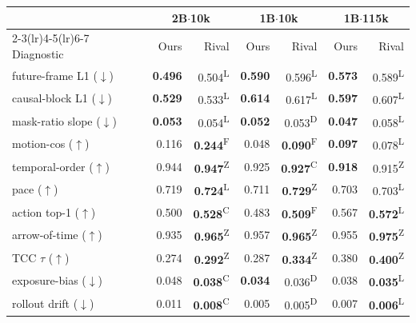 \documentclass[letterpaper]{article} %
\begin{document}
\begin{table}[t]
\centering
\small
\setlength{\tabcolsep}{2pt}
\begin{tabular}{lrrrrrr}
\toprule
 & \multicolumn{2}{c}{2B$\cdot$10k} & \multicolumn{2}{c}{1B$\cdot$10k} & \multicolumn{2}{c}{1B$\cdot$115k} \\
\cmidrule(lr){2-3}\cmidrule(lr){4-5}\cmidrule(lr){6-7}
Diagnostic & Ours & Rival & Ours & Rival & Ours & Rival \\
\midrule
future-frame L1 ($\downarrow$) & \textbf{0.496} & 0.504\textsuperscript{L} & \textbf{0.590} & 0.596\textsuperscript{L} & \textbf{0.573} & 0.589\textsuperscript{L} \\
causal-block L1 ($\downarrow$) & \textbf{0.529} & 0.533\textsuperscript{L} & \textbf{0.614} & 0.617\textsuperscript{L} & \textbf{0.597} & 0.607\textsuperscript{L} \\
mask-ratio slope ($\downarrow$) & \textbf{0.053} & 0.054\textsuperscript{L} & \textbf{0.052} & 0.053\textsuperscript{D} & \textbf{0.047} & 0.058\textsuperscript{L} \\
motion-cos ($\uparrow$) & 0.116 & \textbf{0.244}\textsuperscript{F} & 0.048 & \textbf{0.090}\textsuperscript{F} & \textbf{0.097} & 0.078\textsuperscript{L} \\
\midrule
temporal-order ($\uparrow$) & 0.944 & \textbf{0.947}\textsuperscript{Z} & 0.925 & \textbf{0.927}\textsuperscript{C} & \textbf{0.918} & 0.915\textsuperscript{Z} \\
pace ($\uparrow$) & 0.719 & \textbf{0.724}\textsuperscript{L} & 0.711 & \textbf{0.729}\textsuperscript{Z} & 0.703 & 0.703\textsuperscript{L} \\
action top-1 ($\uparrow$) & 0.500 & \textbf{0.528}\textsuperscript{C} & 0.483 & \textbf{0.509}\textsuperscript{F} & 0.567 & \textbf{0.572}\textsuperscript{L} \\
arrow-of-time ($\uparrow$) & 0.935 & \textbf{0.965}\textsuperscript{Z} & 0.957 & \textbf{0.965}\textsuperscript{Z} & 0.955 & \textbf{0.975}\textsuperscript{Z} \\
TCC $\tau$ ($\uparrow$) & 0.274 & \textbf{0.292}\textsuperscript{Z} & 0.287 & \textbf{0.334}\textsuperscript{Z} & 0.380 & \textbf{0.400}\textsuperscript{Z} \\
exposure-bias ($\downarrow$) & 0.048 & \textbf{0.038}\textsuperscript{C} & \textbf{0.034} & 0.036\textsuperscript{D} & 0.038 & \textbf{0.035}\textsuperscript{L} \\
rollout drift ($\downarrow$) & 0.011 & \textbf{0.008}\textsuperscript{C} & 0.005 & 0.005\textsuperscript{D} & 0.007 & \textbf{0.006}\textsuperscript{L} \\

\end{tabular}
\end{table}
\end{document}
